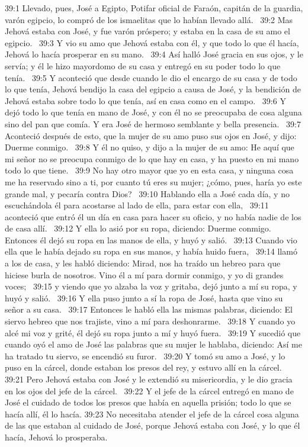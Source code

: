 39:1 Llevado, pues, José a Egipto, Potifar oficial de Faraón, capitán de la guardia, varón egipcio, lo compró de los ismaelitas que lo habían llevado allá.  
39:2 Mas Jehová estaba con José, y fue varón próspero; y estaba en la casa de su amo el egipcio.  
39:3 Y vio su amo que Jehová estaba con él, y que todo lo que él hacía, Jehová lo hacía prosperar en su mano.  
39:4 Así halló José gracia en sus ojos, y le servía; y él le hizo mayordomo de su casa y entregó en su poder todo lo que tenía.  
39:5 Y aconteció que desde cuando le dio el encargo de su casa y de todo lo que tenía, Jehová bendijo la casa del egipcio a causa de José, y la bendición de Jehová estaba sobre todo lo que tenía, así en casa como en el campo.  
39:6 Y dejó todo lo que tenía en mano de José, y con él no se preocupaba de cosa alguna sino del pan que comía. Y era José de hermoso semblante y bella presencia.  
39:7 Aconteció después de esto, que la mujer de su amo puso sus ojos en José, y dijo: Duerme conmigo.  
39:8 Y él no quiso, y dijo a la mujer de su amo: He aquí que mi señor no se preocupa conmigo de lo que hay en casa, y ha puesto en mi mano todo lo que tiene.  
39:9 No hay otro mayor que yo en esta casa, y ninguna cosa me ha reservado sino a ti, por cuanto tú eres su mujer; ¿cómo, pues, haría yo este grande mal, y pecaría contra Dios?  
39:10 Hablando ella a José cada día, y no escuchándola él para acostarse al lado de ella, para estar con ella,  
39:11 aconteció que entró él un día en casa para hacer su oficio, y no había nadie de los de casa allí.  
39:12 Y ella lo asió por su ropa, diciendo: Duerme conmigo. Entonces él dejó su ropa en las manos de ella, y huyó y salió.  
39:13 Cuando vio ella que le había dejado su ropa en sus manos, y había huido fuera,  
39:14 llamó a los de casa, y les habló diciendo: Mirad, nos ha traído un hebreo para que hiciese burla de nosotros. Vino él a mí para dormir conmigo, y yo di grandes voces;  
39:15 y viendo que yo alzaba la voz y gritaba, dejó junto a mí su ropa, y huyó y salió.  
39:16 Y ella puso junto a sí la ropa de José, hasta que vino su señor a su casa.  
39:17 Entonces le habló ella las mismas palabras, diciendo: El siervo hebreo que nos trajiste, vino a mí para deshonrarme.  
39:18 Y cuando yo alcé mi voz y grité, él dejó su ropa junto a mí y huyó fuera.  
39:19 Y sucedió que cuando oyó el amo de José las palabras que su mujer le hablaba, diciendo: Así me ha tratado tu siervo, se encendió su furor.  
39:20 Y tomó su amo a José, y lo puso en la cárcel, donde estaban los presos del rey, y estuvo allí en la cárcel.  
39:21 Pero Jehová estaba con José y le extendió su misericordia, y le dio gracia en los ojos del jefe de la cárcel.  
39:22 Y el jefe de la cárcel entregó en mano de José el cuidado de todos los presos que había en aquella prisión; todo lo que se hacía allí, él lo hacía. 
39:23 No necesitaba atender el jefe de la cárcel cosa alguna de las que estaban al cuidado de José, porque Jehová estaba con José, y lo que él hacía, Jehová lo prosperaba. 
